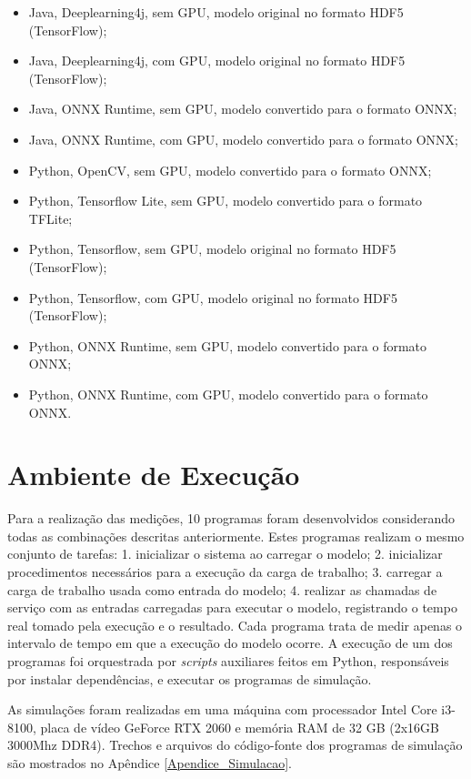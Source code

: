 \begin{itemize}
    \item Java, Deeplearning4j, sem GPU, modelo original no formato HDF5 (TensorFlow);
    \item Java, Deeplearning4j, com GPU, modelo original no formato HDF5 (TensorFlow);
    \item Java, ONNX Runtime, sem GPU, modelo convertido para o formato ONNX;
    \item Java, ONNX Runtime, com GPU, modelo convertido para o formato ONNX;
    \item Python, OpenCV, sem GPU, modelo convertido para o formato ONNX;
    \item Python, Tensorflow Lite, sem GPU, modelo convertido para o formato TFLite;
    \item Python, Tensorflow, sem GPU, modelo original no formato HDF5 (TensorFlow);
    \item Python, Tensorflow, com GPU, modelo original no formato HDF5 (TensorFlow);
    \item Python, ONNX Runtime, sem GPU, modelo convertido para o formato ONNX;
    \item Python, ONNX Runtime, com GPU, modelo convertido para o formato ONNX.
\end{itemize}

\section{Ambiente de Execução}

Para a realização das medições, 10 programas foram desenvolvidos considerando todas as combinações descritas anteriormente. Estes programas realizam o mesmo conjunto de tarefas: 1. inicializar o sistema ao carregar o modelo; 2. inicializar procedimentos necessários para a execução da carga de trabalho; 3. carregar a carga de trabalho usada como entrada do modelo; 4. realizar as chamadas de serviço com as entradas carregadas para executar o modelo, registrando o tempo real tomado pela execução e o resultado. Cada programa trata de medir apenas o intervalo de tempo em que a execução do modelo ocorre. A execução de um dos programas foi orquestrada por \textit{scripts} auxiliares feitos em Python, responsáveis por instalar dependências, e executar os programas de simulação.

As simulações foram realizadas em uma máquina com processador Intel Core i3-8100, placa de vídeo GeForce RTX 2060 e memória RAM de 32 GB (2x16GB 3000Mhz DDR4). Trechos e arquivos do código-fonte dos programas de simulação são mostrados no Apêndice \ref{Apendice_Simulacao}.

